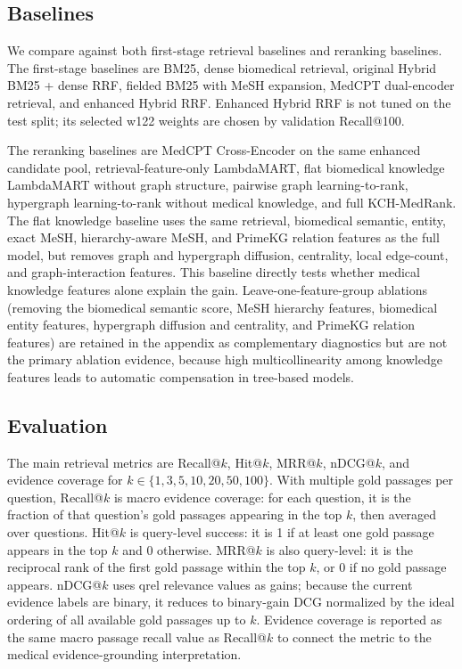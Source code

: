 \subsection{Baselines}

We compare against both first-stage retrieval baselines and reranking baselines. The first-stage baselines are BM25, dense biomedical retrieval, original Hybrid BM25 + dense RRF, fielded BM25 with MeSH expansion, MedCPT dual-encoder retrieval, and enhanced Hybrid RRF. Enhanced Hybrid RRF is not tuned on the test split; its selected w122 weights are chosen by validation Recall@100.

The reranking baselines are MedCPT Cross-Encoder on the same enhanced candidate pool, retrieval-feature-only LambdaMART, flat biomedical knowledge LambdaMART without graph structure, pairwise graph learning-to-rank, hypergraph learning-to-rank without medical knowledge, and full KCH-MedRank. The flat knowledge baseline uses the same retrieval, biomedical semantic, entity, exact MeSH, hierarchy-aware MeSH, and PrimeKG relation features as the full model, but removes graph and hypergraph diffusion, centrality, local edge-count, and graph-interaction features. This baseline directly tests whether medical knowledge features alone explain the gain. Leave-one-feature-group ablations (removing the biomedical semantic score, MeSH hierarchy features, biomedical entity features, hypergraph diffusion and centrality, and PrimeKG relation features) are retained in the appendix as complementary diagnostics but are not the primary ablation evidence, because high multicollinearity among knowledge features leads to automatic compensation in tree-based models.

\subsection{Evaluation}

The main retrieval metrics are Recall@$k$, Hit@$k$, MRR@$k$, nDCG@$k$, and evidence coverage for $k \in \{1,3,5,10,20,50,100\}$. With multiple gold passages per question, Recall@$k$ is macro evidence coverage: for each question, it is the fraction of that question's gold passages appearing in the top $k$, then averaged over questions. Hit@$k$ is query-level success: it is 1 if at least one gold passage appears in the top $k$ and 0 otherwise. MRR@$k$ is also query-level: it is the reciprocal rank of the first gold passage within the top $k$, or 0 if no gold passage appears. nDCG@$k$ uses qrel relevance values as gains; because the current evidence labels are binary, it reduces to binary-gain DCG normalized by the ideal ordering of all available gold passages up to $k$. Evidence coverage is reported as the same macro passage recall value as Recall@$k$ to connect the metric to the medical evidence-grounding interpretation.

